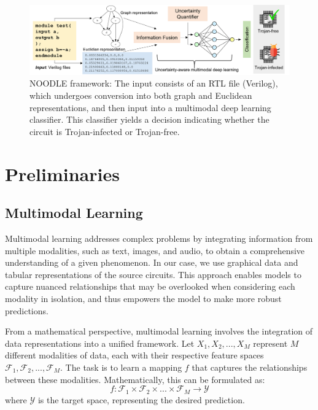 \begin{figure}[ht]
  \centering
   \includegraphics[width=1\textwidth]{figs/BigPicture.png}
   \caption{NOODLE framework: The input consists of an RTL file (Verilog), which undergoes conversion into both graph and Euclidean representations, and then input into a multimodal deep learning classifier. This classifier yields a decision indicating whether the circuit is Trojan-infected or Trojan-free.}
  \label{fig:intro}
\end{figure}

\section*{Preliminaries}
\label{Sec:Prelem}

\subsection*{Multimodal Learning}
\label{sec:multimodal}
Multimodal learning \cite{ngiam2011multimodal} addresses complex problems by integrating information %
from multiple modalities, such as text, images, and audio, to obtain a comprehensive understanding of a given phenomenon. In our case, we use graphical data and tabular representations of the source circuits. This approach enables models to capture nuanced relationships that may be overlooked when considering each modality in isolation, and thus empowers the model to make more robust predictions.

From a mathematical perspective, multimodal learning involves the integration of data representations into a unified framework. Let \(X_1, X_2, ..., X_M\) represent \(M\) different modalities of data, each with their respective feature spaces \(\mathcal{F}_1, \mathcal{F}_2, ..., \mathcal{F}_M\). The task is to learn a mapping \(f\) that captures the relationships between these modalities. Mathematically, this can be formulated as:
\begin{equation}
f: \mathcal{F}_1 \times \mathcal{F}_2 \times ... \times \mathcal{F}_M \rightarrow \mathcal{Y}
\end{equation}
where \(\mathcal{Y}\) is the target space, representing the desired prediction.

